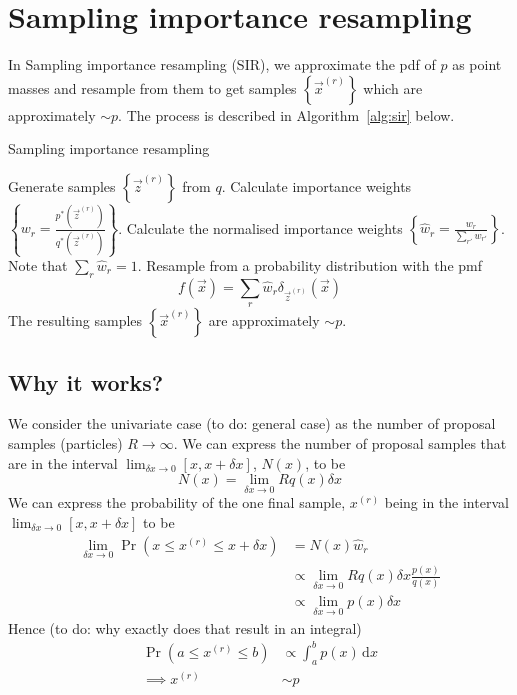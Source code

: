 \section{Sampling importance resampling}
\label{section:sir}
In Sampling importance resampling (SIR), we approximate the pdf of $p$ as point masses and resample from them to get samples $\left\{\vec x^{(r)}\right\}$ which are approximately $\sim p$. The process is described in Algorithm~\ref{alg:sir} below.
\begin{algorithm}
\caption{Sampling importance resampling}\label{alg:sir}
    \begin{algorithmic}[1]
        \State Generate samples $\left\{\vec z^{(r)}\right\}$ from $q$.
        \State Calculate importance weights $\left\{w_r = \frac{p^\ast(\vec z^{(r)})}{q^\ast(\vec z^{(r)})}\right\}$.
        \State Calculate the normalised importance weights $\left\{\hat w_r = \frac{w_r}{\sum_{r'} w_{r'}}\right\}$. Note that $\sum_r \hat w_r  = 1$.
        \State Resample from a probability distribution with the pmf
            \begin{equation}
                f(\vec x) = \sum_r \hat w_r \delta_{\vec z^{(r)}}(\vec x)
            \end{equation}
        \State The resulting samples $\left\{\vec x^{(r)}\right\}$ are approximately $\sim p$.
    \end{algorithmic}
\end{algorithm}

\subsection{Why it works?}
We consider the univariate case (to do: general case) as the number of proposal samples (particles) $R \to \infty$. We can express the number of proposal samples that are in the interval $\lim_{\delta x \to 0}[x, x + \delta x]$, $N(x)$, to be
\begin{equation}
    N(x) = \lim_{\delta x \to 0} R q(x) \delta x
\end{equation}
We can express the probability of the one final sample, $x^{(r)}$ being in the interval $\lim_{\delta x \to 0}[x, x + \delta x]$ to be
\begin{align}
    \lim_{\delta x \to 0} \Pr(x \leq x^{(r)} \leq x + \delta x) &= N(x) \hat w_r \\
                                                                &\propto \lim_{\delta x \to 0} R q(x) \delta x \frac{p(x)}{q(x)} \\
                                                                &\propto \lim_{\delta x \to 0} p(x) \delta x
\end{align}
Hence (to do: why exactly does that result in an integral)
\begin{align}
    \Pr(a \leq x^{(r)} \leq b)  &\propto \int_a^b p(x) \,\mathrm d x \\
    \implies x^{(r)}            &\sim p
\end{align}
